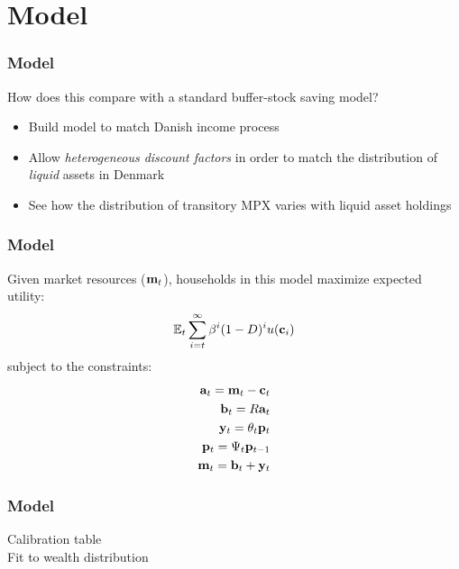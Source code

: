 \documentclass{beamer}
\begin{document}
\section{Model}
\frame
{
	\frametitle{Model}
	How does this compare with a standard buffer-stock saving model?
	\begin{itemize}
		\item Build model to match Danish income process
		\item Allow \textit{heterogeneous discount factors} in order to match the distribution of \textit{liquid} assets in Denmark
		\item See how the distribution of transitory MPX varies with liquid asset holdings
	\end{itemize}
}
\frame
{
	\frametitle{Model}
Given market resources ($\boldmath{\ensuremath{\mathbf{m}}}_t$), households in this model maximize expected utility:
\begin{align*}
\mathbb{E}_t \sum_{i=t}^{\infty} \beta^i(1-D)^i  u(\mathbf{c}_i)
\end{align*}
subject to the constraints:
\begin{align*}
\mathbf{a}_t = \mathbf{m}_t - \mathbf{c}_t \\
\mathbf{b}_t = R\mathbf{a}_t \\
\mathbf{y}_t = \theta_t \mathbf{p}_t \\
\mathbf{p}_t = \Psi_t \mathbf{p}_{t-1} \\
\mathbf{m}_t = \mathbf{b}_t + \mathbf{y}_t
\end{align*}
}
\frame
{
	\frametitle{Model}
Calibration table\\
Fit to wealth distribution
}
\frame
\end{document}
